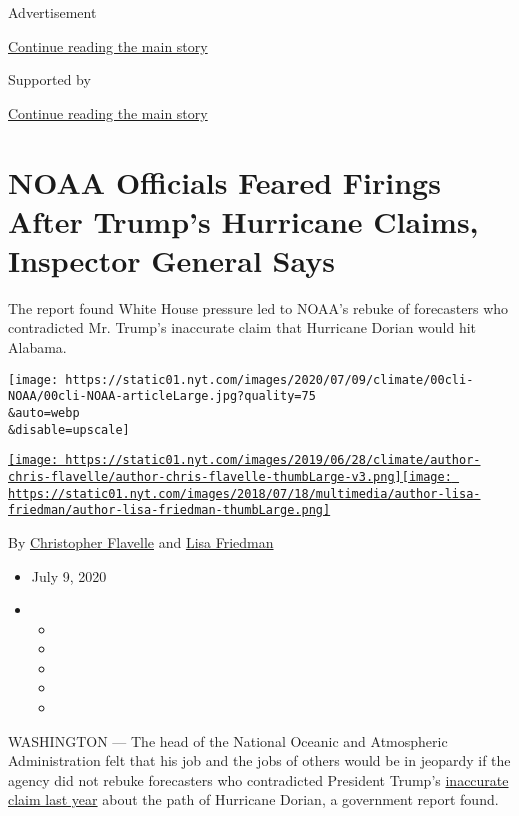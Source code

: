 Advertisement

\protect\hyperlink{after-top}{Continue reading the main story}

Supported by

\protect\hyperlink{after-sponsor}{Continue reading the main story}

\hypertarget{noaa-officials-feared-firings-after-trumps-hurricane-claims-inspector-general-says}{%
\section{NOAA Officials Feared Firings After Trump's Hurricane Claims,
Inspector General
Says}\label{noaa-officials-feared-firings-after-trumps-hurricane-claims-inspector-general-says}}

The report found White House pressure led to NOAA's rebuke of
forecasters who contradicted Mr. Trump's inaccurate claim that Hurricane
Dorian would hit Alabama.

\texttt{[image: https://static01.nyt.com/images/2020/07/09/climate/00cli-NOAA/00cli-NOAA-articleLarge.jpg?quality=75\\\&auto=webp\\\&disable=upscale]}

\href{https://www.nytimes.com/by/christopher-flavelle}{\texttt{[image: https://static01.nyt.com/images/2019/06/28/climate/author-chris-flavelle/author-chris-flavelle-thumbLarge-v3.png]}}\href{https://www.nytimes.com/by/lisa-friedman}{\texttt{[image: https://static01.nyt.com/images/2018/07/18/multimedia/author-lisa-friedman/author-lisa-friedman-thumbLarge.png]}}

By \href{https://www.nytimes.com/by/christopher-flavelle}{Christopher
Flavelle} and \href{https://www.nytimes.com/by/lisa-friedman}{Lisa
Friedman}

\begin{itemize}
\item
  July 9, 2020
\item
  \begin{itemize}
  \item
  \item
  \item
  \item
  \item
  \end{itemize}
\end{itemize}

WASHINGTON --- The head of the National Oceanic and Atmospheric
Administration felt that his job and the jobs of others would be in
jeopardy if the agency did not rebuke forecasters who contradicted
President Trump's
\href{https://www.nytimes.com/2019/09/09/climate/hurricane-dorian-trump-tweet.html}{inaccurate
claim last year} about the path of Hurricane Dorian, a government report
found.

